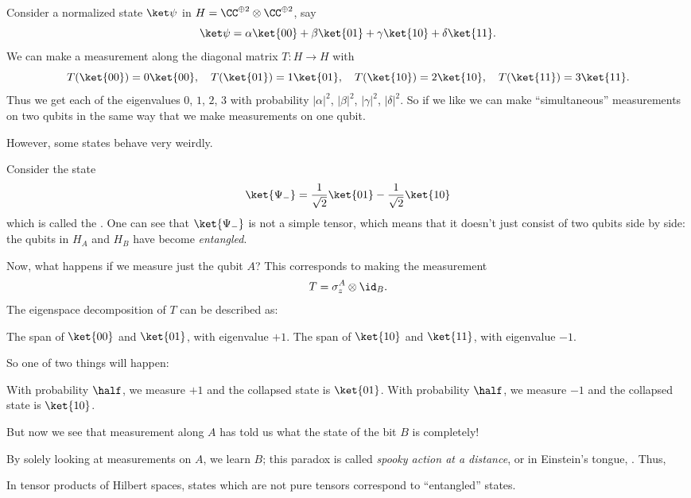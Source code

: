 \begin{example}
	\label{ex:simult_measurement}
	Consider a normalized state $\ket\psi$ in
	$H = \CC^{\oplus 2} \otimes \CC^{\oplus 2}$, say
	\[ \ket\psi = \alpha\ket{00} + \beta\ket{01}
		+ \gamma\ket{10} + \delta\ket{11}. \]
	We can make a measurement along the diagonal matrix
	$T \colon H \to H$ with
	\[ T(\ket{00}) = 0\ket{00}, \quad
	T(\ket{01}) = 1\ket{01}, \quad
	T(\ket{10}) = 2\ket{10}, \quad
	T(\ket{11}) = 3\ket{11}. \]
	Thus we get each of the eigenvalues $0$, $1$, $2$, $3$
	with probability $|\alpha|^2$, $|\beta|^2$, $|\gamma|^2$, $|\delta|^2$.
	So if we like we can make ``simultaneous'' measurements on two qubits
	in the same way that we make measurements on one qubit.
\end{example}

However, some states behave very weirdly.
\begin{example}
	Consider the state
	\[
		\ket{\Psi_-}
		=
		\frac{1}{\sqrt2} \ket{01}
		- \frac{1}{\sqrt2} \ket{10}
	\]
	which is called the .
	One can see that $\ket{\Psi_-}$ is not a simple tensor,
	which means that it doesn't just consist of two qubits side by side:
	the qubits in $H_A$ and $H_B$ have become \emph{entangled}.

	Now, what happens if we measure just the qubit $A$?
	This corresponds to making the measurement
	\[ T = \sigma_z^A \otimes \id_B. \]
	The eigenspace decomposition of $T$ can be described as:
	\begin{itemize}
		\ii The span of $\ket{00}$ and $\ket{01}$, with eigenvalue $+1$.
		\ii The span of $\ket{10}$ and $\ket{11}$, with eigenvalue $-1$.
	\end{itemize}
	So one of two things will happen:
	\begin{itemize}
		\ii With probability $\half$, we measure $+1$
		and the collapsed state is $\ket{01}$.
		\ii With probability $\half$, we measure $-1$
		and the collapsed state is $\ket{10}$.
	\end{itemize}
	But now we see that measurement along $A$ has told us what the
	state of the bit $B$ is completely!
\end{example}
By solely looking at measurements on $A$, we learn $B$;
this paradox is called \emph{spooky action at a distance},
or in Einstein's tongue, .
Thus,
\begin{moral}
	In tensor products of Hilbert spaces,
	states which are not pure tensors
	correspond to ``entangled'' states.
\end{moral}

